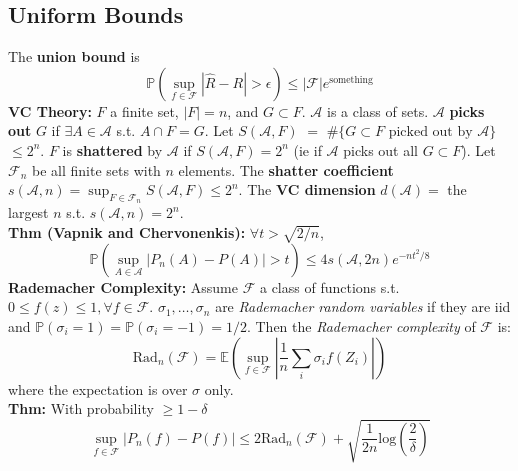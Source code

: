 \documentclass[10pt,twocolumn]{article}
\begin{document}
\subsection*{Uniform Bounds}
    The \textbf{union bound} is 
    \begin{equation}
        \mathbb{P} \left( \sup_{f \in \mathcal{F}} \left| \hat{R} - R  \right| > \epsilon \right) 
            \leq |\mathcal{F}| e^{\text{something}}
    \end{equation}
    \textbf{VC Theory:}
    $F$ a finite set, $|F| = n$, and $G \subset F$. $\mathcal{A}$ is a class of sets.
    $\mathcal{A}$ \textbf{picks out} $G$ if $\exists A \in \mathcal{A}$ s.t. $A \cap F = G$.
    Let $S(\mathcal{A},F)$ $=$ $\#\{G \subset F \text{ picked out by } \mathcal{A}\}$ $\leq 2^{n}$.
    $F$ is \textbf{shattered} by $\mathcal{A}$ if $S(\mathcal{A},F) = 2^{n}$ (ie if $\mathcal{A}$ picks out all $G \subset F$).
    Let $\mathcal{F}_{n}$ be all finite sets with $n$ elements.
    The \textbf{shatter coefficient} $s(\mathcal{A},n) = \sup_{F \in \mathcal{F}_{n}} S(\mathcal{A},F) \leq 2^{n}$.
    The \textbf{VC dimension} $d(\mathcal{A}) =$ the largest $n$ s.t. $s(\mathcal{A},n) = 2^{n}$.\\
    \textbf{Thm (Vapnik and Chervonenkis):} $\forall t>\sqrt{2/n}$, 
    \begin{equation}
        \mathbb{P} \left( \sup_{A \in \mathcal{A}} |P_{n}(A) - P(A)| > t \right) \leq 4 s(\mathcal{A},2n)e^{-nt^{2}/8}
    \end{equation}
    \textbf{Rademacher Complexity:} Assume $\mathcal{F}$ a class of functions s.t. $0 \leq f(z) \leq 1, \forall f \in \mathcal{F}$.
    $\sigma_1,\ldots,\sigma_n$ are \emph{Rademacher random variables} if they are iid and $\mathbb{P}(\sigma_i=1) = \mathbb{P}(\sigma_i=-1) = 1/2$.
    Then the \emph{Rademacher complexity} of $\mathcal{F}$ is:
    \begin{equation}
        \text{Rad}_n(\mathcal{F}) = \mathbb{E} \left( \sup_{f \in \mathcal{F}} \left| \frac{1}{n} \sum_i \sigma_i f(Z_i)  \right|  \right)
    \end{equation}
    where the expectation is over $\sigma$ only.\\
    \textbf{Thm:} With probability $\geq 1-\delta$
    \begin{equation}
        \sup_{f \in \mathcal{F}} \left| P_n(f) - P(f)  \right|
            \leq 2\text{Rad}_n(\mathcal{F}) + \sqrt{\frac{1}{2n} \text{log} \left( \frac{2}{\delta} \right)}
    \end{equation}
\end{document}
